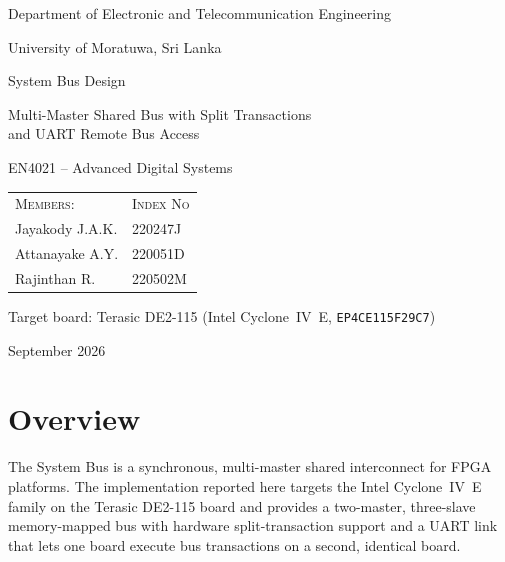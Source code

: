 \documentclass[11pt,a4paper]{article}
\begin{document}
\begin{titlepage}
\centering
\vspace*{1.2cm}

{\large Department of Electronic and Telecommunication Engineering\par}
\vspace{0.35cm}
{\large University of Moratuwa, Sri Lanka\par}

\vspace{3.0cm}

{\Huge System Bus Design\par}
\vspace{0.8cm}
{\large Multi-Master Shared Bus with Split Transactions\\[0.2cm]
and UART Remote Bus Access\par}

\vspace{1.0cm}
{\large EN4021 -- Advanced Digital Systems\par}

\vspace{3.0cm}

\begin{tabular}{ll}
\textsc{Members:} & \textsc{Index No}\\[0.15cm]
Jayakody J.A.K.   & 220247J\\
Attanayake A.Y.   & 220051D\\
Rajinthan R.      & 220502M\\
\end{tabular}

\vfill
{Target board: Terasic DE2-115 (Intel Cyclone~IV~E, \texttt{EP4CE115F29C7})\par}
\vspace{0.2cm}
{September 2026\par}
\end{titlepage}

\newpage
\tableofcontents
\newpage

\section{Overview}

The System Bus is a synchronous, multi-master shared interconnect for FPGA
platforms. The implementation reported here targets the Intel Cyclone~IV~E
family on the Terasic DE2-115 board and provides a two-master, three-slave
memory-mapped bus with hardware split-transaction support and a UART link that
lets one board execute bus transactions on a second, identical board.
\end{document}
